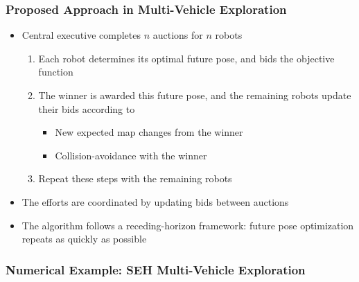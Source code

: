 \documentclass[11pt,professionalfonts,hyperref={pdftex,pdfpagemode=none,pdfstartview=FitH}]{beamer}
\begin{document}
\begin{frame}
\frametitle{Proposed Approach in Multi-Vehicle Exploration}

\begin{itemize}
\item Central executive completes $n$ auctions for $n$ robots
\begin{enumerate}
	\item Each robot determines its optimal future pose, and bids the objective function
	\item The winner is awarded this future pose, and the remaining robots update their bids according to
	\begin{itemize}
		\item New expected map changes from the winner
		\item Collision-avoidance with the winner
	\end{itemize}
	\item Repeat these steps with the remaining robots
\end{enumerate}
\item The efforts are coordinated by updating bids between auctions
\item The algorithm follows a receding-horizon framework: future pose optimization repeats as quickly as possible
\end{itemize}
\end{frame}

\begin{frame}
\frametitle{Numerical Example: SEH Multi-Vehicle Exploration}




\end{frame}
\end{document}
